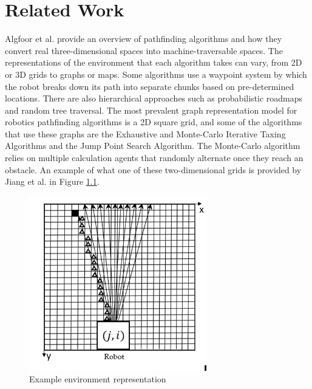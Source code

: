 \chapter{Related Work} 
\label{ch:relatedwork}


Algfoor et al. \cite{abd2015comprehensive} provide an overview of pathfinding algorithms and how they convert real three-dimensional spaces into machine-traversable spaces. The representations of the environment that each algorithm takes can vary, from 2D or 3D grids to graphs or maps. Some algorithms use a waypoint system by which the robot breaks down its path into separate chunks based on pre-determined locations. There are also hierarchical approaches such as probabilistic roadmaps and random tree traversal. The most prevalent graph representation model for robotics pathfinding algorithms is a 2D square grid, and some of the algorithms that use these graphs are the Exhaustive and Monte-Carlo Iterative Taxing Algorithms and the Jump Point Search Algorithm. The Monte-Carlo algorithm relies on multiple calculation agents that randomly alternate once they reach an obstacle. An example of what one of these two-dimensional grids is provided by Jiang et al.\cite{jiang2018eight} in Figure \ref{fig:Environment}.
\begin{figure}[H]
    \centering
    \includegraphics{images/EnvironmentRepresentation.PNG}
    \caption{Example environment representation}
    \label{fig:Environment}
\end{figure}
